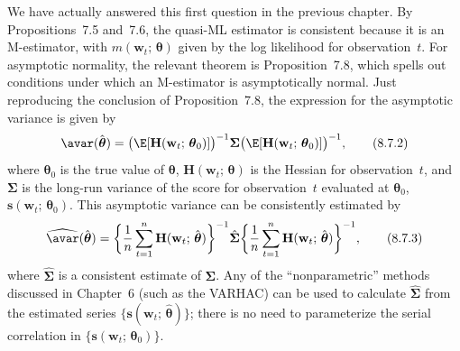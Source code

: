 We have actually answered this first question in the previous chapter. By
Propositions~7.5 and~7.6, the quasi-ML estimator is consistent because it is an
M-estimator, with $m(\mathbf{w}_t;\, \boldsymbol{\theta})$ given by the log likelihood for observation~$t$. For
asymptotic normality, the relevant theorem is Proposition~7.8, which spells out
conditions under which an M-estimator is asymptotically normal. Just reproducing the conclusion of Proposition~7.8, the expression for the asymptotic variance is
given by
\begin{equation}
  \avar(\hat{\boldsymbol{\theta}})
  = \bigl(\E[\mathbf{H}(\mathbf{w}_t;\, \boldsymbol{\theta}_0)]\bigr)^{-1}
    \boldsymbol{\Sigma}
    \bigl(\E[\mathbf{H}(\mathbf{w}_t;\, \boldsymbol{\theta}_0)]\bigr)^{-1},
  \label{eq:8.7.2} \tag{8.7.2}
\end{equation}
where $\boldsymbol{\theta}_0$ is the true value of $\boldsymbol{\theta}$,
$\mathbf{H}(\mathbf{w}_t;\, \boldsymbol{\theta})$ is the Hessian for observation~$t$, and
$\boldsymbol{\Sigma}$ is
the long-run variance of the score for observation~$t$ evaluated at $\boldsymbol{\theta}_0$,
$\mathbf{s}(\mathbf{w}_t;\, \boldsymbol{\theta}_0)$. This
asymptotic variance can be consistently estimated by
\begin{equation}
  \widehat{\avar}(\hat{\boldsymbol{\theta}})
  = \biggl\{\frac{1}{n}\sum_{t=1}^{n}
    \mathbf{H}(\mathbf{w}_t;\, \hat{\boldsymbol{\theta}})\biggr\}^{-1}
    \hat{\boldsymbol{\Sigma}}
    \biggl\{\frac{1}{n}\sum_{t=1}^{n}
    \mathbf{H}(\mathbf{w}_t;\, \hat{\boldsymbol{\theta}})\biggr\}^{-1},
  \label{eq:8.7.3} \tag{8.7.3}
\end{equation}
where $\hat{\boldsymbol{\Sigma}}$ is a consistent estimate of $\boldsymbol{\Sigma}$. Any of the ``nonparametric'' methods discussed in Chapter~6 (such as the VARHAC) can be used to calculate $\hat{\boldsymbol{\Sigma}}$ from the
estimated series $\{\mathbf{s}(\mathbf{w}_t;\, \hat{\boldsymbol{\theta}})\}$; there is no need to parameterize the serial correlation
in $\{\mathbf{s}(\mathbf{w}_t;\, \boldsymbol{\theta}_0)\}$.

